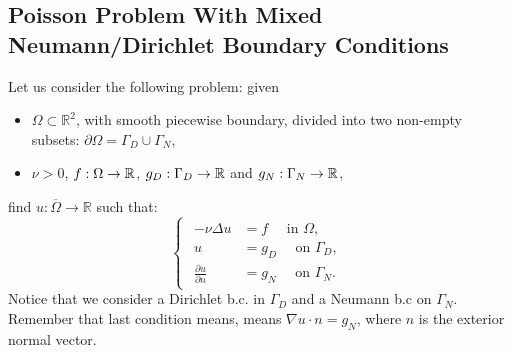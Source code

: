 \documentclass[12pt]{article}
\newcommand{\R}{{\mathbb R}}
\begin{document}
\subsection{Poisson Problem With Mixed Neumann/Dirichlet Boundary Conditions}
\label{sec:poisson-problem-with-mixed-bc}

Let us consider the following problem: given
\begin{itemize}
\item $\Omega\subset\R^2$, with smooth piecewise boundary, divided into
  two non-empty subsets:
  $\partial\Omega=\Gamma_D\cup\Gamma_N$,
\item $\nu>0$, $f: \Omega \to {\mathbb R}$, $g_D:\Gamma_D\to{\mathbb R}$ and
$g_N:\Gamma_N\to{\mathbb R}$,
\end{itemize}
find $u:\overline\Omega \rightarrow \R$ such that:
\begin{equation}
  \label{eq:poisson-mixto}
  \begin{cases}
    \begin{aligned}
      -\nu\Delta u &= f \quad \text{ in } \Omega, \\
      u &= g_D \quad \text{ on } \Gamma_D, \\
      \frac{\partial u}{\partial n} &= g_N \quad \text{ on } \Gamma_N.
    \end{aligned}
  \end{cases}
\end{equation}
Notice that we consider a Dirichlet b.c. in $\Gamma_D$ and
a Neumann b.c on $\Gamma_N$. Remember that last condition means, means
$\nabla u \cdot n=g_N$, where $n$ is the exterior normal vector.
\end{document}
